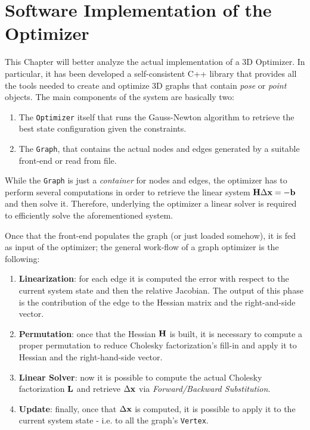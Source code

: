 \chapter{Software Implementation of the Optimizer}\label{ch:implementation}
This Chapter will better analyze the actual implementation of a 3D Optimizer. In particular, it has been developed a self-consistent C++ library that provides all the tools needed to create and optimize 3D graphs that contain \textit{pose} or \textit{point} objects. The main components of the system are basically two:

\begin{enumerate}
    \item The \texttt{Optimizer} itself that runs the Gauss-Newton algorithm to retrieve the best state configuration given the constraints.
    \item The \texttt{Graph}, that contains the actual nodes and edges generated by a suitable front-end or read from file.
\end{enumerate}

While the \texttt{Graph} is just a \textit{container} for nodes and edges, the optimizer has to perform several computations in order to retrieve the linear system $\mathbf{H} \Delta \mathbf{x} = -\mathbf{b}$ and then solve it. Therefore, underlying the optimizer a linear solver is required to efficiently solve the aforementioned system. 

Once that the front-end populates the graph (or just loaded somehow), it is fed as input of the optimizer; the general work-flow of a graph optimizer is the following:

\begin{enumerate}
    \item \textbf{Linearization}: for each edge it is computed the error with respect to the current system state and then the relative Jacobian. The output of this phase is the contribution of the edge to the Hessian matrix and the right-and-side vector.
    \item \textbf{Permutation}: once that the Hessian $\mathbf{H}$ is built, it is necessary to compute a proper permutation to reduce Cholesky factorization's fill-in and apply it to Hessian and the right-hand-side vector.
    \item \textbf{Linear Solver}: now it is possible to compute the actual Cholesky factorization $\mathbf{L}$ and retrieve $\Delta \mathbf{x}$ via \textit{Forward/Backward Substitution}.
    \item \textbf{Update}: finally, once that $\Delta \mathbf{x}$ is computed, it is possible to apply it to the current system state -  i.e. to all the graph's \texttt{Vertex}.
\end{enumerate}

